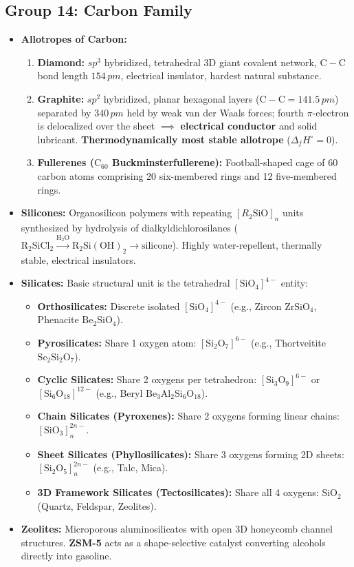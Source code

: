 \documentclass[10pt,twoside,openright]{book}
\begin{document}
\subsection{Group 14: Carbon Family}
\begin{itemize}
  \item \textbf{Allotropes of Carbon:}
  \begin{enumerate}
    \item \textbf{Diamond:} $sp^3$ hybridized, tetrahedral 3D giant covalent network, $\mathrm{C-C}$ bond length $154\,\si{pm}$, electrical insulator, hardest natural substance.
    \item \textbf{Graphite:} $sp^2$ hybridized, planar hexagonal layers ($\mathrm{C-C} = 141.5\,\si{pm}$) separated by $340\,\si{pm}$ held by weak van der Waals forces; fourth $\pi$-electron is delocalized over the sheet $\implies$ \textbf{electrical conductor} and solid lubricant. \textbf{Thermodynamically most stable allotrope} ($\Delta_f H^\circ = 0$).
    \item \textbf{Fullerenes ($\mathrm{C_{60}}$ Buckminsterfullerene):} Football-shaped cage of 60 carbon atoms comprising 20 six-membered rings and 12 five-membered rings.
  \end{enumerate}
  \item \textbf{Silicones:} Organosilicon polymers with repeating $[R_2\mathrm{SiO}]_n$ units synthesized by hydrolysis of dialkyldichlorosilanes ($\mathrm{R_2SiCl_2} \xrightarrow{\mathrm{H_2O}} \mathrm{R_2Si(OH)_2} \to \text{silicone}$). Highly water-repellent, thermally stable, electrical insulators.
  \item \textbf{Silicates:} Basic structural unit is the tetrahedral $[\mathrm{SiO_4}]^{4-}$ entity:
  \begin{itemize}
    \item \textbf{Orthosilicates:} Discrete isolated $[\mathrm{SiO_4}]^{4-}$ (e.g., Zircon $\mathrm{ZrSiO_4}$, Phenacite $\mathrm{Be_2SiO_4}$).
    \item \textbf{Pyrosilicates:} Share 1 oxygen atom: $[\mathrm{Si_2O_7}]^{6-}$ (e.g., Thortveitite $\mathrm{Sc_2Si_2O_7}$).
    \item \textbf{Cyclic Silicates:} Share 2 oxygens per tetrahedron: $[\mathrm{Si_3O_9}]^{6-}$ or $[\mathrm{Si_6O_{18}}]^{12-}$ (e.g., Beryl $\mathrm{Be_3Al_2Si_6O_{18}}$).
    \item \textbf{Chain Silicates (Pyroxenes):} Share 2 oxygens forming linear chains: $[\mathrm{SiO_3}]_n^{2n-}$.
    \item \textbf{Sheet Silicates (Phyllosilicates):} Share 3 oxygens forming 2D sheets: $[\mathrm{Si_2O_5}]_n^{2n-}$ (e.g., Talc, Mica).
    \item \textbf{3D Framework Silicates (Tectosilicates):} Share all 4 oxygens: $\mathrm{SiO_2}$ (Quartz, Feldspar, Zeolites).
  \end{itemize}
  \item \textbf{Zeolites:} Microporous aluminosilicates with open 3D honeycomb channel structures. \textbf{ZSM-5} acts as a shape-selective catalyst converting alcohols directly into gasoline.
\end{itemize}
\end{document}
